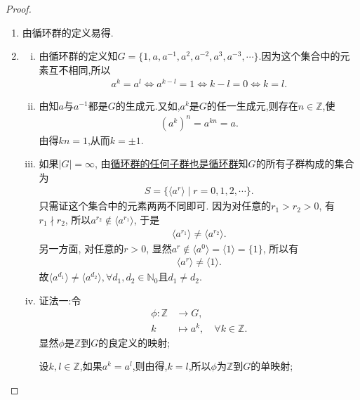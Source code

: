 \documentclass[../../main.tex]{subfiles}%
\begin{document}
\begin{proof}
\begin{enumerate}[(1)]
\item 由循环群的定义易得.

\item \begin{enumerate}[(i)]
\item 由循环群的定义知$G = \{1, a, a^{-1}, a^2, a^{-2}, a^3, a^{-3}, \cdots\}$.因为这个集合中的元素互不相同,所以
\begin{align*}
a^k=a^l\iff a^{k-l}=1\iff k-l = 0\iff k=l.
\end{align*}

\item 由知$a$与$a^{-1}$都是$G$的生成元.又如,$a^k$是$G$的任一生成元,则存在$n \in \mathbb{Z}$,使
\begin{align*}
(a^k)^n = a^{kn} = a.
\end{align*}
由得$kn=1$,从而$k=\pm1$.

\item 如果$|G|=\infty$, 由\hyperref[theorem:循环群的任何子群也是循环群]{循环群的任何子群也是循环群}知$G$的所有子群构成的集合为
\begin{align*}
S=\{\langle a^r\rangle \mid r=0,1,2,\cdots \}.
\end{align*}
只需证这个集合中的元素两两不同即可.
因为对任意的$r_1>r_2>0$, 有$r_1\nmid r_2$, 所以$a^{r_2}\notin\langle a^{r_1}\rangle$, 于是
\begin{align*}
\langle a^{r_1}\rangle\neq\langle a^{r_2}\rangle.
\end{align*}
另一方面, 对任意的$r>0$, 显然$a^r\notin\langle a^0\rangle=\langle 1\rangle=\{1\}$, 所以有
\begin{align*}
\langle a^r\rangle\neq\langle 1\rangle.
\end{align*}
故$\langle a^{d_1} \rangle \neq \langle a^{d_2} \rangle,\forall d_1,d_2\in \mathbb{N}_0\text{且}d_1\neq d_2$.

\item {\color{blue}证法一:}令
\begin{align*}
\phi: \mathbb{Z} &\to G, \\
k &\mapsto a^k,\quad \forall k \in \mathbb{Z}.
\end{align*}
显然$\phi$是$\mathbb{Z}$到$G$的良定义的映射;

设$k,l \in \mathbb{Z}$,如果$a^k = a^l$,则由得,$k = l$,所以$\phi$为$\mathbb{Z}$到$G$的单映射;


\end{enumerate}
\end{enumerate}
\end{proof}
\end{document}
